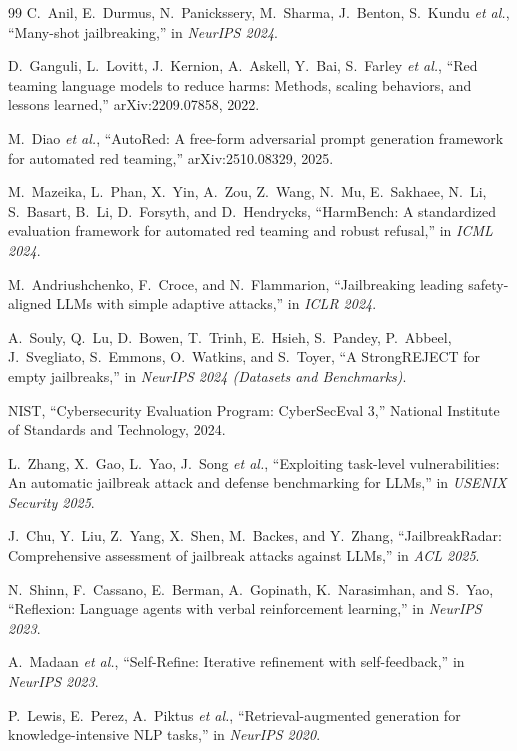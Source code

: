\documentclass[conference]{IEEEtran}
\begin{document}
\begin{thebibliography}{99}
 C.~Anil, E.~Durmus, N.~Panickssery, M.~Sharma, J.~Benton, S.~Kundu \textit{et al.}, ``Many-shot jailbreaking,'' in \textit{NeurIPS 2024}.

 D.~Ganguli, L.~Lovitt, J.~Kernion, A.~Askell, Y.~Bai, S.~Farley \textit{et al.}, ``Red teaming language models to reduce harms: Methods, scaling behaviors, and lessons learned,'' arXiv:2209.07858, 2022.

 M.~Diao \textit{et al.}, ``AutoRed: A free-form adversarial prompt generation framework for automated red teaming,'' arXiv:2510.08329, 2025.

 M.~Mazeika, L.~Phan, X.~Yin, A.~Zou, Z.~Wang, N.~Mu, E.~Sakhaee, N.~Li, S.~Basart, B.~Li, D.~Forsyth, and D.~Hendrycks, ``HarmBench: A standardized evaluation framework for automated red teaming and robust refusal,'' in \textit{ICML 2024}.

 M.~Andriushchenko, F.~Croce, and N.~Flammarion, ``Jailbreaking leading safety-aligned LLMs with simple adaptive attacks,'' in \textit{ICLR 2024}.

 A.~Souly, Q.~Lu, D.~Bowen, T.~Trinh, E.~Hsieh, S.~Pandey, P.~Abbeel, J.~Svegliato, S.~Emmons, O.~Watkins, and S.~Toyer, ``A StrongREJECT for empty jailbreaks,'' in \textit{NeurIPS 2024 (Datasets and Benchmarks)}.

 NIST, ``Cybersecurity Evaluation Program: CyberSecEval 3,'' National Institute of Standards and Technology, 2024.

 L.~Zhang, X.~Gao, L.~Yao, J.~Song \textit{et al.}, ``Exploiting task-level vulnerabilities: An automatic jailbreak attack and defense benchmarking for LLMs,'' in \textit{USENIX Security 2025}.

 J.~Chu, Y.~Liu, Z.~Yang, X.~Shen, M.~Backes, and Y.~Zhang, ``JailbreakRadar: Comprehensive assessment of jailbreak attacks against LLMs,'' in \textit{ACL 2025}.

 N.~Shinn, F.~Cassano, E.~Berman, A.~Gopinath, K.~Narasimhan, and S.~Yao, ``Reflexion: Language agents with verbal reinforcement learning,'' in \textit{NeurIPS 2023}.

 A.~Madaan \textit{et al.}, ``Self-Refine: Iterative refinement with self-feedback,'' in \textit{NeurIPS 2023}.

 P.~Lewis, E.~Perez, A.~Piktus \textit{et al.}, ``Retrieval-augmented generation for knowledge-intensive NLP tasks,'' in \textit{NeurIPS 2020}.


\end{thebibliography}
\end{document}
